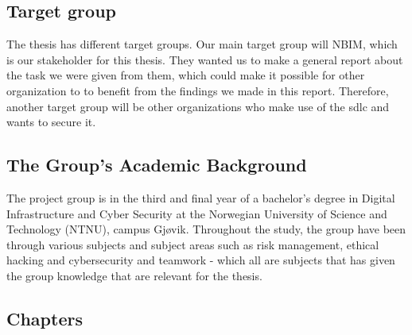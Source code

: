 \subsection{Target group}
The thesis has different target groups. Our main target group will NBIM, which is our stakeholder for this thesis. They wanted us to make a general report about the task we were given from them, which could make it possible for other organization to to benefit from the findings we made in this report. Therefore, another target group will be other organizations who make use of the \acrshort{sdlc} and wants to secure it. 
\subsection{The Group’s Academic Background}
The project group is in the third and final year of a bachelor's degree in Digital Infrastructure and Cyber Security at the Norwegian University of Science and Technology (NTNU), campus Gjøvik. Throughout the study, the group have been through various subjects and subject areas such as risk management, ethical hacking and cybersecurity and teamwork - which all are subjects that has given the group knowledge that are relevant for the thesis. 
\subsection{Chapters}

